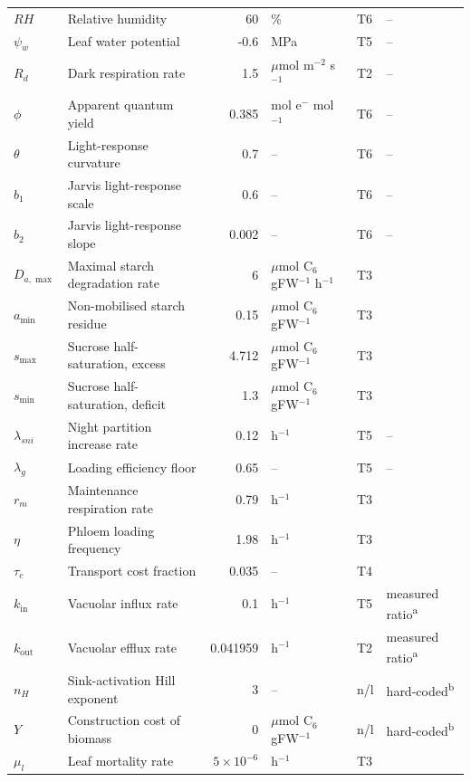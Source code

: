 \begin{table}[!htbp]
\begin{tabular}{@{}llrlll@{}}
$\mathit{RH}$ & Relative humidity & 60 & \% & T6 & -- \\
$\psi_w$ & Leaf water potential & -0.6 & MPa & T5 & -- \\
$R_d$ & Dark respiration rate & 1.5 & $\mu$mol m$^{-2}$ s$^{-1}$ & T2 & -- \\
$\phi$ & Apparent quantum yield & 0.385 & mol e$^-$ mol$^{-1}$ & T6 & -- \\
$\theta$ & Light-response curvature & 0.7 & -- & T6 & -- \\
$b_1$ & Jarvis light-response scale & 0.6 & -- & T6 & -- \\
$b_2$ & Jarvis light-response slope & 0.002 & -- & T6 & -- \\
$D_{a,\max}$ & Maximal starch degradation rate & 6 & $\mu$mol C$_6$ gFW$^{-1}$ h$^{-1}$ & T3 & \citet{Tedone2020} \\
$a_{\min}$ & Non-mobilised starch residue & 0.15 & $\mu$mol C$_6$ gFW$^{-1}$ & T3 & \citet{Tedone2020} \\
$s_{\max}$ & Sucrose half-saturation, excess & 4.712 & $\mu$mol C$_6$ gFW$^{-1}$ & T3 & \citet{Tedone2020} \\
$s_{\min}$ & Sucrose half-saturation, deficit & 1.3 & $\mu$mol C$_6$ gFW$^{-1}$ & T3 & \citet{Tedone2020} \\
$\lambda_{sni}$ & Night partition increase rate & 0.12 & h$^{-1}$ & T5 & -- \\
$\lambda_g$ & Loading efficiency floor & 0.65 & -- & T5 & -- \\
$r_m$ & Maintenance respiration rate & 0.79 & h$^{-1}$ & T3 & \citet{Tedone2020} \\
$\eta$ & Phloem loading frequency & 1.98 & h$^{-1}$ & T3 & \citet{Tedone2020} \\
$\tau_c$ & Transport cost fraction & 0.035 & -- & T4 & \citet{Tedone2020} \\
$k_{\mathrm{in}}$ & Vacuolar influx rate & 0.1 & h$^{-1}$ & T5 & measured ratio\textsuperscript{a} \\
$k_{\mathrm{out}}$ & Vacuolar efflux rate & 0.041959 & h$^{-1}$ & T2 & measured ratio\textsuperscript{a} \\
$n_H$ & Sink-activation Hill exponent & 3 & -- & n/l & hard-coded\textsuperscript{b} \\
$Y$ & Construction cost of biomass & 0 & $\mu$mol C$_6$ gFW$^{-1}$ & n/l & hard-coded\textsuperscript{b} \\
$\mu_l$ & Leaf mortality rate & $5\times 10^{-6}$ & h$^{-1}$ & T3 & \citet{Tedone2020} \\

\end{tabular}
\end{table}
